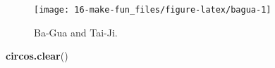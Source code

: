 \documentclass[]{book}
\newenvironment{Shaded}{\begin{snugshade}}{\end{snugshade}}
\newcommand{\KeywordTok}[1]{\textcolor[rgb]{0.13,0.29,0.53}{\textbf{#1}}}
\newcommand{\NormalTok}[1]{#1}
\begin{document}
\begin{figure}

{\centering \texttt{[image: 16-make-fun\_files/figure-latex/bagua-1]} 

}

\caption{Ba-Gua and Tai-Ji.}\label{fig:bagua}
\end{figure}

\begin{Shaded}
\begin{Highlighting}[]
\KeywordTok{circos.clear}\NormalTok{()}
\end{Highlighting}
\end{Shaded}


\end{document}
